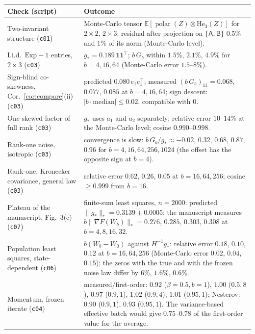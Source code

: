 \documentclass[10pt]{article}
\theoremstyle{definition}
\theoremstyle{remark}
\newcommand{\E}{\mathbb{E}}
\newcommand{\nnuc}[1]{\|#1\|_{*}}
\newcommand{\polar}{\operatorname{polar}}
\newcommand{\He}{\mathrm{He}}
\newcommand{\cA}{\mathsf{A}}
\newcommand{\cB}{\mathsf{B}}
\newcommand{\ones}{\mathbf{1}}
\begin{document}
\begin{table}[h]
\centering\small
\begin{tabular}{@{}p{}p{}@{}}
\toprule
Check (script) & Outcome\\
\midrule
Two-invariant structure (\texttt{c01}) & Monte-Carlo tensor $\E[\polar(Z)\otimes\He_3(Z)]$ for $2\times2$, $2\times3$:
residual after projection on $\{\cA,\cB\}$ $0.5\%$ and $1\%$ of its norm (Monte-Carlo level).\\
I.i.d.\ $\mathrm{Exp}-1$ entries, $2\times3$ (\texttt{c03}) & $g_\ast=0.189\,\ones\ones^\top$; $b\,G_b$ within $1.5\%$, $2.1\%$,
$4.9\%$ for $b=4,16,64$ (Monte-Carlo error $1.5$--$8\%$).\\
Sign-blind co-skewness, Cor.~\ref{cor:compare}(ii) (\texttt{c03}) & predicted $0.080\,e_1e_1^\top$; measured $(b\,G_b)_{11}=0.068$,
$0.077$, $0.085$ at $b=4,16,64$; sign descent: $|b\cdot\text{median}|\le0.02$, compatible with $0$.\\
One skewed factor of full rank (\texttt{c03}) & $g_\ast$ uses $a_1$ and $a_2$ separately; relative error $10$--$14\%$ at the
Monte-Carlo level; cosine $0.990$--$0.998$.\\
Rank-one noise, isotropic (\texttt{c03}) & convergence is slow: $b\,G_b/g_\ast\approx-0.02$, $0.32$, $0.68$, $0.87$, $0.96$ for
$b=4,16,64,256,1024$ (the offset has the opposite sign at $b=4$).\\
Rank-one, Kronecker covariance, general law (\texttt{c03}) & relative error $0.62$, $0.26$, $0.05$ at $b=16,64,256$; cosine
$\ge0.999$ from $b=16$.\\
Plateau of the manuscript, Fig.~3(c) (\texttt{c07}) & finite-sum least squares, $n=2000$: predicted
$\nnuc{g_\ast}=0.3139\pm0.0005$; the manuscript measures $b\nnuc{\nabla F(W_b)}=0.276$, $0.285$, $0.303$, $0.308$ at
$b=4,8,16,32$.\\
Population least squares, state-dependent (\texttt{c06}) & $b(W_b-W_0)$ against $H^{-1}g_\ast$: relative error $0.18$,
$0.10$, $0.12$ at $b=16,64,256$ (Monte-Carlo error $0.02$, $0.04$, $0.15$); the zeros with the true and with the frozen
noise law differ by $6\%$, $1.6\%$, $0.6\%$.\\
Momentum, frozen iterate (\texttt{c04}) & measured$/$first-order: $0.92$ ($\beta=0.5,b=1$), $1.00$ ($0.5,8$), $0.97$
($0.9,1$), $1.02$ ($0.9,4$), $1.01$ ($0.95,1$); Nesterov: $0.90$ ($0.9,1$), $0.93$ ($0.95,1$). The variance-based
effective batch would give $0.75$--$0.78$ of the first-order value for the average.\\

\end{tabular}
\end{table}
\end{document}
